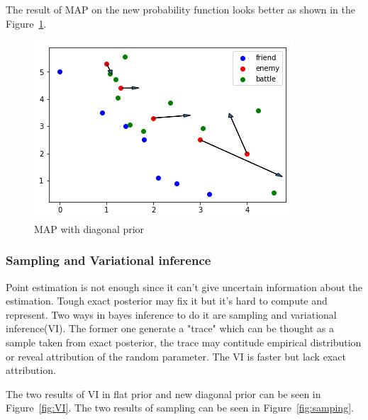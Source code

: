 \documentclass{article}
\begin{document}
The result of MAP on the new probability function looks better as shown in the Figure~\ref{fig:MAPtwo}.

\begin{figure}[h]
\includegraphics[width=0.6\linewidth]{MAP2.png}
\caption{MAP with diagonal prior}
\label{fig:MAPtwo}
\end{figure}

\subsubsection{Sampling and Variational inference}

Point estimation is not enough since it can't give uncertain information about the estimation.
Tough exact posterior may fix it but it's hard to compute and represent. Two ways in bayes inference 
to do it are sampling and variational inference(VI). The former one generate a "trace" which can be thought
as a sample taken from exact posterior, the trace may contitude empirical distribution or reveal 
attribution of the random parameter. The VI is faster but lack exact attribution.

The two results of VI in flat prior and new diagonal prior can be seen in Figure~\ref{fig:VI}.
The two results of sampling can be seen in Figure~\ref{fig:samping}.
\end{document}
